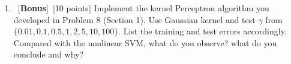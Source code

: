 \documentclass[12pt, fullpage,letterpaper]{article}
\begin{document}
\begin{enumerate}
\begin{enumerate}
	\item~[\textbf{Bonus}]~[10 points] Implement the kernel Perceptron algorithm you developed in Problem 8 (Section 1). Use Gaussian kernel and test $\gamma$ from $\{0.01, 0.1, 0.5, 1, 2, 5, 10, 100\}$. List the training and test errors accordingly. Compared with the nonlinear SVM, what do you observe? what do you conclude and why?
	
\end{enumerate} 

\end{enumerate}
\end{document}
